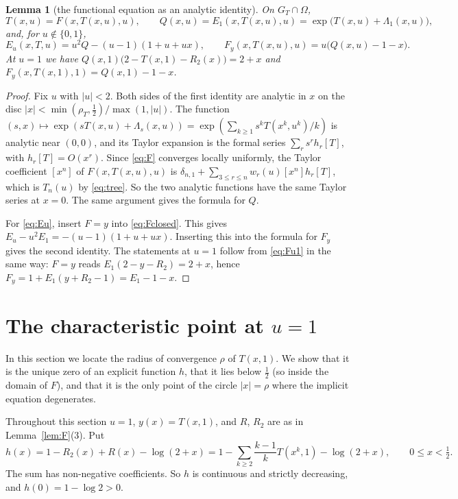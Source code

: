 \documentclass[11pt]{amsart}
\newtheorem{lemma}[theorem]{Lemma}
\theoremstyle{definition}
\theoremstyle{remark}
\numberwithin{equation}{section}
\newcommand{\abs}[1]{\lvert #1\rvert}
\begin{document}
\begin{lemma}[the functional equation as an analytic identity]\label{lem:funeq}
On \(G_T\cap\Omega\),
\begin{equation}\label{eq:funeq}
T(x,u)=F(x,T(x,u),u),\qquad Q(x,u)=E_1(x,T(x,u),u)=\exp\bigl(T(x,u)+\Lambda_1(x,u)\bigr),
\end{equation}
and, for \(u\notin\{0,1\}\),
\begin{equation}\label{eq:Eu}
E_u(x,T,u)=u^2Q-(u-1)(1+u+ux),\qquad F_y(x,T(x,u),u)=u\bigl(Q(x,u)-1-x\bigr).
\end{equation}
At \(u=1\) we have \(Q(x,1)\bigl(2-T(x,1)-R_2(x)\bigr)=2+x\) and \(F_y(x,T(x,1),1)=Q(x,1)-1-x\).
\end{lemma}

\begin{proof}
Fix \(u\) with \(\abs{u}<2\). Both sides of the first identity are analytic in \(x\) on the disc \(\abs{x}<\min(\rho_T,\frac12)/\max(1,\abs{u})\). The function \((s,x)\mapsto\exp(sT(x,u)+\Lambda_s(x,u))=\exp(\sum_{k\ge1}s^kT(x^k,u^k)/k)\) is analytic near \((0,0)\), and its Taylor expansion is the formal series \(\sum_rs^rh_r[T]\), with \(h_r[T]=O(x^r)\). Since \eqref{eq:F} converges locally uniformly, the Taylor coefficient \([x^n]\) of \(F(x,T(x,u),u)\) is \(\delta_{n,1}+\sum_{3\le r\le n}w_r(u)[x^n]h_r[T]\), which is \(T_n(u)\) by \eqref{eq:tree}. So the two analytic functions have the same Taylor series at \(x=0\). The same argument gives the formula for \(Q\).

For \eqref{eq:Eu}, insert \(F=y\) into \eqref{eq:Fclosed}. This gives \(E_u-u^2E_1=-(u-1)(1+u+ux)\). Inserting this into the formula for \(F_y\) gives the second identity. The statements at \(u=1\) follow from \eqref{eq:Fu1} in the same way: \(F=y\) reads \(E_1(2-y-R_2)=2+x\), hence \(F_y=1+E_1(y+R_2-1)=E_1-1-x\).
\end{proof}

\section{The characteristic point at \texorpdfstring{\(u=1\)}{u=1}}\label{sec:char}

In this section we locate the radius of convergence \(\rho\) of \(T(x,1)\). We show that it is the unique zero of an explicit function \(h\), that it lies below \(\frac12\) (so inside the domain of \(F\)), and that it is the only point of the circle \(\abs{x}=\rho\) where the implicit equation degenerates.

Throughout this section \(u=1\), \(y(x)=T(x,1)\), and \(R\), \(R_2\) are as in Lemma~\ref{lem:F}(3). Put
\[
h(x)=1-R_2(x)+R(x)-\log(2+x)=1-\sum_{k\ge2}\frac{k-1}{k}T(x^k,1)-\log(2+x),\qquad 0\le x<\tfrac12 .
\]
The sum has non-negative coefficients. So \(h\) is continuous and strictly decreasing, and \(h(0)=1-\log2>0\).
\end{document}
